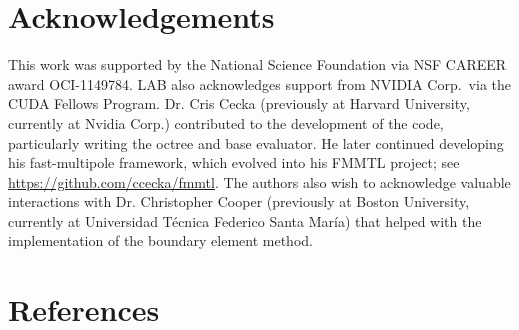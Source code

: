 \documentclass[final,3p,times]{elsarticle}
\begin{document}
\clearpage
\section*{Acknowledgements}
 This work was supported by the National Science Foundation via NSF CAREER award OCI-1149784. LAB also acknowledges support from NVIDIA Corp.\ via the CUDA Fellows Program. 
Dr. Cris Cecka (previously at Harvard University, currently at Nvidia Corp.) contributed to the development of the code, particularly writing the octree and base evaluator. He later continued developing his fast-multipole framework, which evolved into his FMMTL project; see \href{https://github.com/ccecka/fmmtl}{https://github.com/ccecka/fmmtl}.
The authors also wish to acknowledge valuable interactions with Dr. Christopher Cooper (previously at Boston University, currently at Universidad T{\'e}cnica Federico Santa Mar{\'i}a) that helped with the implementation of the boundary element method.


\section*{References}


\end{document}
